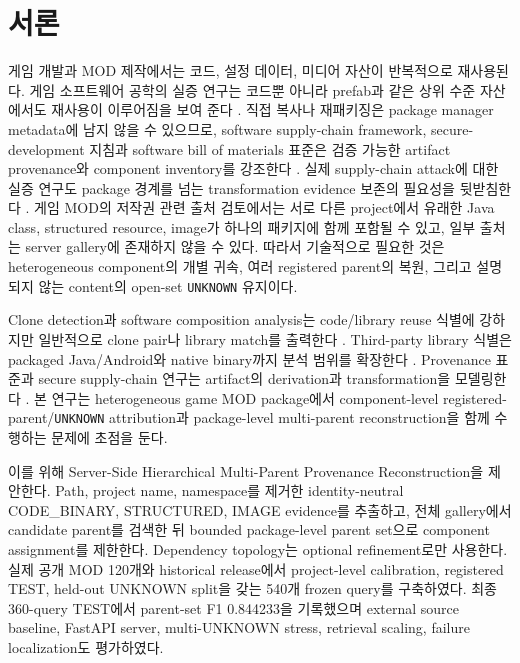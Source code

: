 \documentclass[runningheads]{llncs}
\begin{document}
\section{서론}

게임 개발과 MOD 제작에서는 코드, 설정 데이터, 미디어 자산이 반복적으로 재사용된다. 게임 소프트웨어 공학의 실증 연구는 코드뿐 아니라 prefab과 같은 상위 수준 자산에서도 재사용이 이루어짐을 보여 준다 \cite{trasobares2025reuse}. 직접 복사나 재패키징은 package manager metadata에 남지 않을 수 있으므로, software supply-chain framework, secure-development 지침과 software bill of materials 표준은 검증 가능한 artifact provenance와 component inventory를 강조한다 \cite{torresarias2019intoto,nist2022ssdf,iso5962spdx}. 실제 supply-chain attack에 대한 실증 연구도 package 경계를 넘는 transformation evidence 보존의 필요성을 뒷받침한다 \cite{ohm2020backstabber}. 게임 MOD의 저작권 관련 출처 검토에서는 서로 다른 project에서 유래한 Java class, structured resource, image가 하나의 패키지에 함께 포함될 수 있고, 일부 출처는 server gallery에 존재하지 않을 수 있다. 따라서 기술적으로 필요한 것은 heterogeneous component의 개별 귀속, 여러 registered parent의 복원, 그리고 설명되지 않는 content의 open-set \texttt{UNKNOWN} 유지이다.

Clone detection과 software composition analysis는 code/library reuse 식별에 강하지만 일반적으로 clone pair나 library match를 출력한다 \cite{roy2008nicad,sajnani2016sourcerer,heinze2026stone}. Third-party library 식별은 packaged Java/Android와 native binary까지 분석 범위를 확장한다 \cite{backes2016libscout,bincofer2025}. Provenance 표준과 secure supply-chain 연구는 artifact의 derivation과 transformation을 모델링한다 \cite{w3c2013provdm,torresarias2019intoto}. 본 연구는 heterogeneous game MOD package에서 component-level registered-parent/\texttt{UNKNOWN} attribution과 package-level multi-parent reconstruction을 함께 수행하는 문제에 초점을 둔다.

이를 위해 Server-Side Hierarchical Multi-Parent Provenance Reconstruction을 제안한다. Path, project name, namespace를 제거한 identity-neutral CODE\_BINARY, STRUCTURED, IMAGE evidence를 추출하고, 전체 gallery에서 candidate parent를 검색한 뒤 bounded package-level parent set으로 component assignment를 제한한다. Dependency topology는 optional refinement로만 사용한다. 실제 공개 MOD 120개와 historical release에서 project-level calibration, registered TEST, held-out UNKNOWN split을 갖는 540개 frozen query를 구축하였다. 최종 360-query TEST에서 parent-set F1 0.844233을 기록했으며 external source baseline, FastAPI server, multi-UNKNOWN stress, retrieval scaling, failure localization도 평가하였다.
\end{document}
